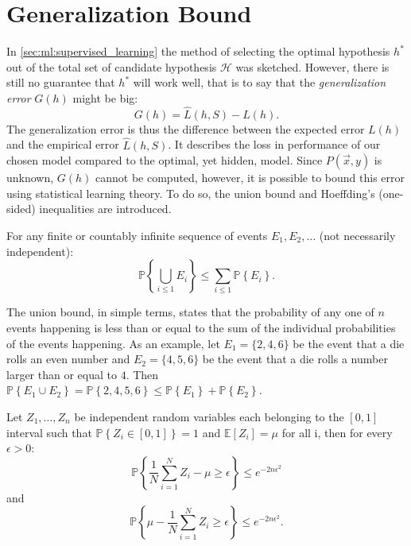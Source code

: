 \section{Generalization Bound}
\label{sec:generalization_bound}
In \autoref{sec:ml:supervised_learning} the method of selecting the optimal hypothesis $h^*$ out of the total set of candidate hypothesis $\mathcal{H}$ was sketched. However, there is still no guarantee that $h^*$ will work well, that is to say that the \emph{generalization error} $G(h)$ might be big:
\begin{equation}
  G(h) = \hat{L}(h, S) - L(h).
\end{equation}
The generalization error is thus the difference between the expected error $L(h)$ and the empirical error $\hat{L}(h, S)$. It describes the loss in performance of our chosen model compared to the optimal, yet hidden, model. Since $P(\vec{x}, y)$ is unknown, $G(h)$ cannot be computed, however, it is possible to bound this error using statistical learning theory. To do so, the union bound and Hoeffding's (one-sided) inequalities are introduced. 
\begin{lemma}
  For any finite or countably infinite sequence of events $E_1, E_2, \dots$ (not necessarily independent): 
  \begin{equation}
    \mathbb{P} \left\{\bigcup_{i \leq 1} E_i \right\} \leq \sum_{i \leq 1} \mathbb{P} \left\{E_i \right \}. 
  \end{equation}
\end{lemma}
The union bound, in simple terms, states that the probability of any one of $n$ events happening is less than or equal to the sum of the individual probabilities of the events happening. As an example, let $E_1=\{2, 4, 6\}$ be the event that a die rolls an even number and $E_2=\{4, 5, 6\}$ be the event that a die rolls a number larger than or equal to $4$. Then $\mathbb{P} \left\{E_1 \cup E_2 \right\} = \mathbb{P} \left\{ 2, 4, 5, 6 \right\} \leq \mathbb{P} \left\{E_1 \right \} + \mathbb{P} \left\{E_2 \right \} $. 
\begin{lemma}
  Let $Z_1, \dots, Z_n$ be independent random variables each belonging to the $[0, 1]$ interval such that $\mathbb{P}\left\{Z_i \in [0, 1] \right\} = 1$ and $\mathbb{E}[Z_i] = \mu$ for all i, then for every $\epsilon > 0$:
  \begin{equation}
    \mathbb{P} \left\{  \frac{1}{N}\sum_{i=1}^N Z_i - \mu \geq \epsilon \right\} \leq e^{-2n\epsilon^2} 
    \label{eq:hoeffding_onesided_a}
  \end{equation}
  and
  \begin{equation}
    \mathbb{P} \left\{ \mu - \frac{1}{N}\sum_{i=1}^N Z_i  \geq \epsilon \right\} \leq e^{-2n\epsilon^2}.
    \label{eq:hoeffding_onesided_b}
  \end{equation}
\end{lemma}
